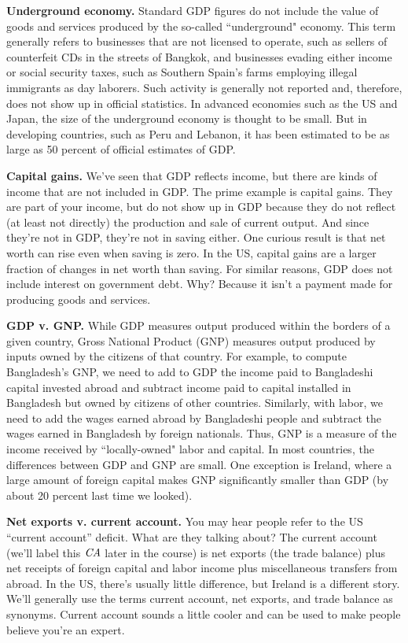 \textbf{Underground economy.}
Standard GDP figures do not include the value of goods and
services produced by the so-called ``underground" economy. This
term generally refers to businesses that are not licensed to
operate, such as sellers of counterfeit CDs in the streets of
Bangkok, and businesses evading either income or social security
taxes, such as Southern Spain's farms employing illegal immigrants
as day laborers.  Such activity is generally not reported and,
therefore, does not show up in official statistics. In advanced
economies such as the US and Japan, the size of the underground
economy is thought to be small.  But in developing countries, such
as Peru and Lebanon, it has been estimated to be as large as 50 percent
of official estimates of GDP.

\textbf{Capital gains.} We've seen that GDP reflects income, but
there are kinds of income that are not included in GDP. The
prime example is capital gains. They are part of your income, but
do not show up in GDP because they do not reflect (at least not
directly) the production and sale of current output. And since
they're not in GDP, they're not in saving either.
One curious result is that net worth can rise even when saving is zero.
In the US, capital gains are a larger fraction of changes in net worth
than saving.
For similar reasons, GDP does not include interest on government debt.
Why?  Because it isn't a payment
made for producing goods and services.


\textbf{GDP v. GNP.}
While GDP measures output produced within the borders of a
given country, Gross National Product (GNP) measures output produced by
inputs owned by the citizens of that country. For example, to
compute Bangladesh's GNP, we need to add to GDP the income
paid to Bangladeshi capital invested abroad and subtract income
paid to capital installed in Bangladesh but owned by citizens of
other countries. Similarly, with labor, we need to add the wages
earned abroad by Bangladeshi people and subtract the wages earned
in Bangladesh by foreign nationals. Thus, GNP is a measure of
the income received by ``locally-owned" labor and capital. In most
countries, the differences between GDP and GNP are small.
One exception is Ireland, where a large amount of foreign capital
makes GNP significantly smaller than GDP (by about 20 percent last
time we looked).

\textbf{Net exports v. current account.} You may hear people refer
to the US ``current account'' deficit. What are they talking
about? The current account (we'll label this $\mbox{\it CA\/}$
later in the course) is net exports (the trade balance) plus net
receipts of foreign capital and labor income plus miscellaneous
transfers from abroad. In the US, there's usually little difference, but Ireland is a different story.  We'll generally use the terms
current account, net exports, and trade balance as synonyms.
Current account sounds a little cooler and can be used to make
people believe you're an expert.


